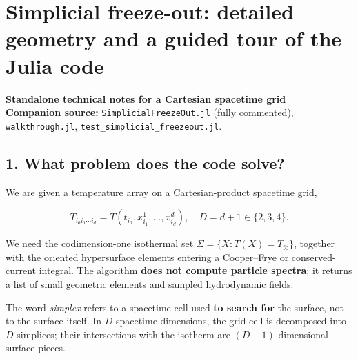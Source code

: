 \documentclass[
  10pt,
]{article}
\author{}
\date{}
\begin{document}
\section{Simplicial freeze-out: detailed geometry and a guided tour of
the Julia
code}\label{simplicial-freeze-out-detailed-geometry-and-a-guided-tour-of-the-julia-code}

\textbf{Standalone technical notes for a Cartesian spacetime grid}\\
\textbf{Companion source:} \texttt{SimplicialFreezeOut.jl} (fully
commented), \texttt{walkthrough.jl},
\texttt{test\_simplicial\_freezeout.jl}.

\subsection{1. What problem does the code
solve?}\label{what-problem-does-the-code-solve}

We are given a temperature array on a Cartesian-product spacetime grid,

\[
T_{i_0 i_1\cdots i_d}=T(t_{i_0},x^1_{i_1},\ldots,x^d_{i_d}),
\quad D=d+1\in\{2,3,4\}.
\]

We need the codimension-one isothermal set
\(\Sigma=\{X:T(X)=T_{\mathrm{fo}}\}\), together with the oriented
hypersurface elements entering a Cooper--Frye or conserved-current
integral. The algorithm \textbf{does not compute particle spectra}; it
returns a list of small geometric elements and sampled hydrodynamic
fields.

The word \emph{simplex} refers to a spacetime cell used \textbf{to
search for} the surface, not to the surface itself. In \(D\) spacetime
dimensions, the grid cell is decomposed into \(D\)-simplices; their
intersections with the isotherm are \((D-1)\)-dimensional surface
pieces.
\end{document}
